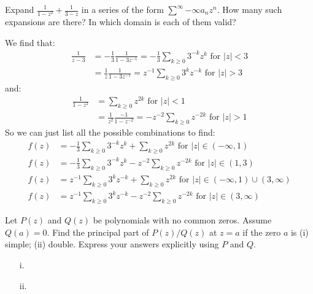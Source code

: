 \documentclass[12pt]{article}
\begin{document}
\begin{statement}
  Expand $\frac{1}{1-z^2} + \frac{1}{3-z}$ in a series of the form $\sum^{\infty}{-\infty} a_nz^n$. How many 
  such expansions are there? In which domain is each of them valid?
\end{statement}
\begin{newproof}
  We find that:
  \begin{align*}
    \frac{1}{z-3} &= -\frac{1}{3} \frac{1}{1-3z^{-1}}=-\frac{1}{3} \sum_{ k \geq 0} 3^{-k}z^{k} \text{ for } \vert z \vert < 3 \\
                  &= \frac{1}{z} \frac{1}{1-3z^{-1}} = z^{-1}\sum_{k \geq 0} 3^kz^{-k} \text{ for } \vert z \vert > 3 
  \end{align*}
  and:
  \begin{align*}
    \frac{1}{1-z^2} &= \sum_{k \geq 0} z^{2k} \text{ for } \vert z \vert < 1 \\
                    &= \frac{1}{z^2} \frac{-1}{1-z^{-2}}=-z^{-2}\sum_{k \geq 0} z^{-2k} \text{ for } \vert z \vert > 1 
  \end{align*}
  So we can just list all the possible combinations to find:
  \begin{align*}
    f(z) &= -\frac{1}{3} \sum_{ k \geq 0} 3^{-k}z^{k} + \sum_{k \geq 0} z^{2k} \text{ for } \vert z \vert \in (-\infty, 1) \\
    f(z) &= -\frac{1}{3} \sum_{ k \geq 0} 3^{-k}z^{k}-z^{-2}\sum_{k \geq 0} z^{-2k} \text{ for } \vert z \vert \in (1,3) \\
    f(z) &= z^{-1}\sum_{k \geq 0} 3^kz^{-k} + \sum_{k \geq 0} z^{2k} \text{ for } \vert z \vert \in (-\infty,1) \cup (3, \infty) \\
    f(z) &= z^{-1}\sum_{k \geq 0} 3^kz^{-k}-z^{-2}\sum_{k \geq 0} z^{-2k} \text{ for } \vert z \vert \in (3,\infty)
  \end{align*}
\end{newproof}

\begin{statement}
  Let $P(z)$ and $Q(z)$ be polynomials with no common zeros. Assume $Q(a)=0$. Find the principal part of 
  $P(z)/Q(z)$ at $z=a$ if the zero $a$ is (i) simple; (ii) double. Express your answers explicitly using $P$ and $Q$. 
\end{statement}
\begin{newproof}
  \begin{itemize}
    \item[i.]
    \item[ii.]
  \end{itemize}
\end{newproof}
\end{document}
